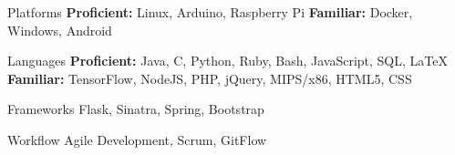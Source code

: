 
\vspace{-1.5mm}
\begin{cvskills}

  \vspace{0mm}


  \cvskill
    {Platforms} %
    {\textbf{Proficient:} Linux, Arduino, Raspberry Pi \newline \textbf{Familiar:} Docker, Windows, Android} %

  \vspace{0mm}
  
  \cvskill
    {Languages} %
    {\textbf{Proficient:} Java, C, Python, Ruby, Bash, JavaScript, SQL, LaTeX \newline \textbf{Familiar:} TensorFlow, NodeJS, PHP, jQuery, MIPS/x86, HTML5, CSS} %

  \vspace{0mm}

  \cvskill
    {Frameworks} %
    {Flask, Sinatra, Spring, Bootstrap} %

  \vspace{0mm}

  \cvskill
    {Workflow} %
    {Agile Development, Scrum, GitFlow} %

\end{cvskills}
\vspace{-0.5mm}